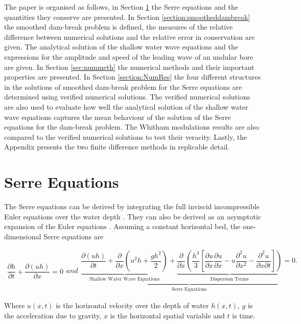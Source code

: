 \documentclass[times]{elsarticle}
\begin{document}
The paper is organised as follows, in Section \ref{section:Serre Equations} the Serre equations and the quantities they conserve are presented. In Section \ref{section:smootheddambreak} the smoothed dam-break problem is defined, the measures of the relative difference between numerical solutions and the relative error in conservation are given. The analytical solution of the shallow water wave equations and the expressions for the amplitude and speed of the leading wave of an undular bore are given. In Section \ref{sec:nummeth} the numerical methods and their important properties are presented. In Section \ref{section:NumRes} the four different structures in the solutions of smoothed dam-break problem for the Serre equations are determined using verified numerical solutions. The verified numerical solutions are also used to evaluate how well the analytical solution of the shallow water wave equations captures the mean behaviour of the solution of the Serre equations for the dam-break problem. The Whitham modulations results are also compared to the verified numerical solutions to test their veracity. Lastly, the Appendix presents the two finite difference methods in replicable detail. 

\section{Serre Equations}
\label{section:Serre Equations}
The Serre equations can be derived by integrating the full inviscid incompressible Euler equations over the water depth \cite{Su-Gardener-1969-536}. They can also be derived as an asymptotic expansion of the Euler equations \cite{Bonneton-Lannes-2009-16601}. Assuming a constant horizontal bed, the one-dimensional Serre equations are \cite{Guyenne-etal-2014-169}
\begin{linenomath*}
\begin{subequations}\label{eq:Serre_nonconservative_form}
\begin{gather}
\dfrac{\partial h}{\partial t} + \dfrac{\partial (uh)}{\partial x} = 0
\label{eq:Serre_continuity}
\end{gather}
and
\begin{gather}
\underbrace{\underbrace{\dfrac{\partial (uh)}{\partial t} + \dfrac{\partial}{\partial x} \left ( u^2h + \dfrac{gh^2}{2}\right )}_{\text{Shallow Water Wave Equations}} + \underbrace{\dfrac{\partial}{\partial x} \left (  \dfrac{h^3}{3} \left [ \dfrac{\partial u }{\partial x} \dfrac{\partial u}{\partial x} - u\dfrac{\partial^2 u}{\partial x^2}  - \dfrac{\partial^2 u}{\partial x \partial t}\right ] \right )}_{\text{Dispersion Terms}} = 0.}_{\text{Serre Equations}}
\label{eq:Serre_momentum}
\end{gather}
\end{subequations}
\end{linenomath*}
Where $u(x,t)$ is the horizontal velocity over the depth of water $h(x,t)$, $g$ is the acceleration due to gravity, $x$ is the horizontal spatial variable and $t$ is time. 
\end{document}
